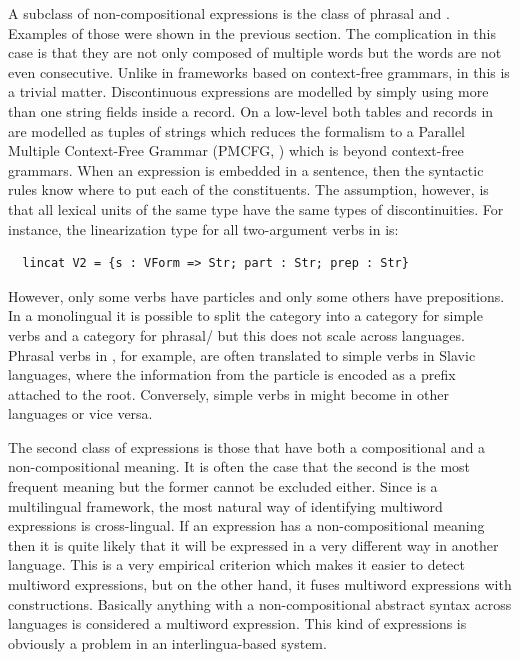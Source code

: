 \documentclass[output=paper]{langsci/langscibook}
\begin{document}
A subclass of non-compositional expressions is the class of phrasal and 
. Examples of those were shown in 
the previous section. The complication in this case is that they are 
not only composed of multiple words but the words are not 
even consecutive. Unlike in frameworks based on context-free grammars, 
in  this is a trivial matter. Discontinuous expressions 
are modelled by simply using more than one string fields inside a record.
On a low-level both tables and records in  are modelled as 
tuples of strings which reduces the formalism to 
a Parallel Multiple Context-Free Grammar (PMCFG, \citealt{seki91:mcfg}) 
which is beyond context-free grammars. When an expression is embedded in 
a sentence, then the syntactic rules know where to put each of 
the constituents. The assumption, however, is that 
all lexical units of the same type have the same types of discontinuities. 
For instance, the linearization type for all two-argument verbs in  is:
\begin{verbatim}
  lincat V2 = {s : VForm => Str; part : Str; prep : Str}
\end{verbatim}
However, only some verbs have particles and only some others have prepositions. In a monolingual  it is possible to split the category into a category for simple verbs and a category for phrasal/ but this does not scale across languages. Phrasal verbs in , for example, are often translated to simple verbs in Slavic languages, where the information from the particle is encoded as a prefix attached to the root. Conversely, simple verbs in  might become  in other languages or vice versa.

The second class of expressions is those that have both a compositional 
and a non-compositional meaning. It is often the case that the second is 
the most frequent meaning but the former cannot be excluded either. 
Since  is a multilingual framework, the most natural way of 
identifying multiword expressions is cross-lingual. If an expression 
has a non-compositional meaning then it is quite likely that 
it will be expressed in a very different way in another language. 
This is a very empirical criterion which makes it easier to detect 
multiword expressions, but on the other hand, it fuses 
multiword expressions with constructions. Basically anything with 
a non-compositional abstract syntax across languages is considered 
a multiword expression. This kind of expressions is obviously a problem 
in an interlingua-based system.
\end{document}

